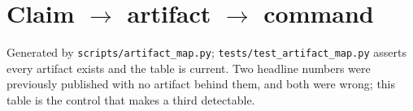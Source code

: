 \documentclass[sigconf,nonacm]{acmart}
\begin{document}
{\scriptsize}



\section{Claim $\to$ artifact $\to$ command}
\label{app:map}

Generated by \texttt{scripts/artifact\_map.py};
\texttt{tests/test\_artifact\_map.py} asserts every artifact exists and the
table is current. Two headline numbers were previously published with no
artifact behind them, and both were wrong; this table is the control that
makes a third detectable.

\begin{table}[p]
\caption{Every load-bearing claim, the artifact it traces to, and the command
that regenerates it.}
\label{tab:map}
\scriptsize

\end{table}
\end{document}
